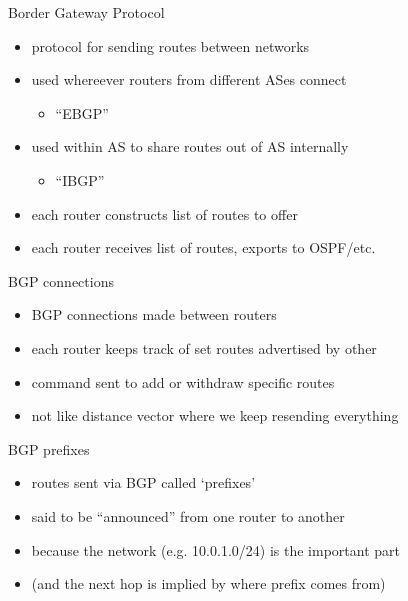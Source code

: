 \begin{frame}{Border Gateway Protocol}
    \begin{itemize}
    \item protocol for sending routes between networks
    \item used whereever routers from different ASes connect
        \begin{itemize}
        \item ``EBGP''
        \end{itemize}
    \item used within AS to share routes out of AS internally
        \begin{itemize}
        \item ``IBGP''
        \end{itemize}
    \vspace{.5cm}
    \item each router constructs list of routes to offer
    \item each router receives list of routes, exports to OSPF/etc.
    \end{itemize}
\end{frame}

\begin{frame}{BGP connections}
    \begin{itemize}
    \item BGP connections made between routers
    \vspace{.5cm}
    \item each router keeps track of set routes advertised by other
    \item command sent to add or withdraw specific routes
    \vspace{.5cm}
    \item not like distance vector where we keep resending everything
    \end{itemize}
\end{frame}

\begin{frame}{BGP prefixes}
    \begin{itemize}
    \item routes sent via BGP called `prefixes'
    \item said to be ``announced'' from one router to another
    \vspace{.5cm}
    \item because the network (e.g. 10.0.1.0/24) is the important part
    \item (and the next hop is implied by where prefix comes from) 
    \end{itemize}
\end{frame}
